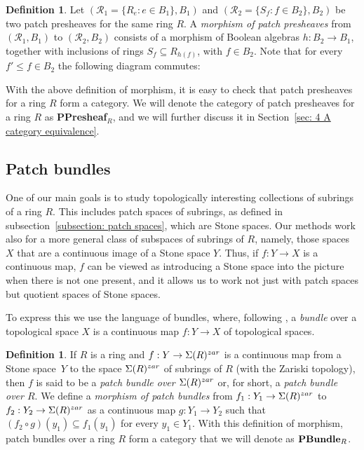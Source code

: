 \documentclass[11pt]{amsart}
\theoremstyle{definition}
\newtheorem{definition}[theorem]{Definition}
\def\cal{\mathcal}
\begin{document}
\begin{definition}\label{dfn: patch presheaf morphism}
Let $({\cal R}_1=\{R_e : e\in B_1\}, B_1)$ and $({\cal R}_2=\{S_f : f\in B_2\}, B_2)$ be two patch presheaves for the same ring $R$. A {\it morphism of patch presheaves} from $({\cal R}_1, B_1)$ to $({\cal R}_2, B_2)$ consists of a morphism of Boolean algebras $h: B_2\rightarrow B_1$, together with inclusions of rings $S_f\subseteq  R_{h(f)}$, with $f\in B_2$. Note that for every $f'\le f\in B_2$ the following diagram commutes:
\begin{center}
\end{center}
\end{definition} 

With the above definition of morphism, it is easy to check that patch presheaves for a ring $R$ form a category. We will denote the category of patch presheaves for a ring $R$ as {\bf PPresheaf}$_R$, and we will further discuss it in Section~\ref{sec: 4 A category equivalence}.


\subsection{Patch bundles}\label{subsec: patch bundles}

 One of our main goals is to study topologically interesting collections of subrings of a ring $R$. This includes patch spaces of subrings, as defined in subsection~\ref{subsection: patch spaces}, which are Stone spaces. Our methods work  
 also for  a more general class of subspaces of subrings of $R$, namely, those spaces $X$  that are a continuous image of a Stone space $Y$. Thus, if $f:Y \rightarrow X$ is a continuous map, $f$ can be viewed as introducing a Stone space into the picture when there is  not one present, and it allows us to work not just with patch spaces but quotient spaces of Stone spaces. 

To express this we use the language of bundles, where, following \cite[p.~170]{Joh86}, a {\it bundle} over a topological space $X$ is a continuous map $f:Y \rightarrow X$ of topological spaces.

\begin{definition} 
 If $R$ is a ring and $f:Y \rightarrow \Sigma(R)^{\rm zar}$ is a continuous map from a Stone space~$Y$ to the space $\Sigma(R)^{\rm zar}$ of subrings of $R$ (with the Zariski topology), then $f$ is said to be a {\it patch bundle over $\Sigma(R)^{\rm zar}$} or, for short, a {\it patch bundle over $R$}. We define a {\it morphism of patch bundles} from $f_1:Y_1 \rightarrow \Sigma(R)^{\rm zar}$ to $f_2:Y_2 \rightarrow \Sigma(R)^{\rm zar}$ as a continuous map $g:Y_1 \rightarrow Y_2$ such that $(f_2 \circ g) (y_1)\subseteq f_1(y_1)$ for every $y_1\in Y_1$. With this definition of morphism, patch bundles over a ring $R$ form a category that we will denote as ${\bf PBundle}_R$.
\end{definition}
\end{document}
